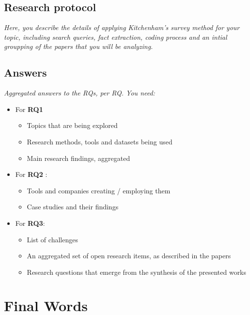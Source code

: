 \documentclass[]{book}
\providecommand{\tightlist}{%
  \setlength{\itemsep}{0pt}\setlength{\parskip}{0pt}}
\begin{document}
\section{Research protocol}\label{research-protocol}

\emph{Here, you describe the details of applying Kitchenham's survey
method for your topic, including search queries, fact extraction, coding
process and an intial groupping of the papers that you will be
analyzing.}

\section{Answers}\label{answers}

\emph{Aggregated answers to the RQs, per RQ. You need:}

\begin{itemize}
\tightlist
\item
  For \textbf{RQ1}

  \begin{itemize}
  \tightlist
  \item
    Topics that are being explored
  \item
    Research methods, tools and datasets being used
  \item
    Main research findings, aggregated
  \end{itemize}
\item
  For \textbf{RQ2} :

  \begin{itemize}
  \tightlist
  \item
    Tools and companies creating / employing them
  \item
    Case studies and their findings
  \end{itemize}
\item
  For \textbf{RQ3}:

  \begin{itemize}
  \tightlist
  \item
    List of challenges
  \item
    An aggregated set of open research items, as described in the papers
  \item
    Research questions that emerge from the synthesis of the presented
    works
  \end{itemize}
\end{itemize}

\chapter{Final Words}\label{final-words}
\end{document}
